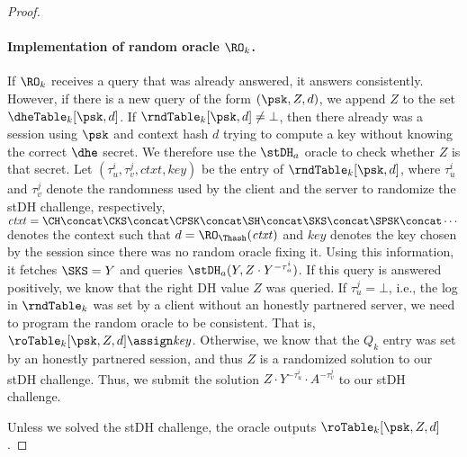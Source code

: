 \begin{proof}
	\paragraph{Implementation of random oracle $\RO_k$.}
	If $\RO_k$ receives a query that was already answered, it answers consistently.
	However, if there is a new query of the form $(\psk, Z, d)$, we append $Z$ to the set $\dheTable_k[\psk, d]$.
	If $\rndTable_k[\psk, d] \neq \bot$, then there already was a session using $\psk$ and context hash $d$ trying to compute a key without knowing the correct $\dhe$ secret.
	We therefore use the $\stDH_a$ oracle to check whether $Z$ is that secret.
	Let $(\tau_u^i, \tau_v^j, \mathit{ctxt}, \mathit{key})$ be the entry of $\rndTable_k[\psk, d]$, where $\tau_u^i$ and $\tau_v^j$ denote the randomness used by the client and the server to randomize the stDH challenge, respectively, $\mathit{ctxt} = \CH \concat \CKS \concat \CPSK \concat \SH \concat \SKS \concat \SPSK \concat \dotsb$ denotes the context such that $d = \RO_\Thash(\mathit{ctxt})$ and $\mathit{key}$ denotes the key chosen by the session since there was no random oracle fixing it.
	Using this information, it fetches $\SKS = Y$ and queries $\stDH_a(Y, Z \cdot Y^{-\tau_u^i})$.
	If this query is answered positively, we know that the right DH value $Z$ was queried.
	If $\tau_u^j = \bot$, i.e., the log in $\rndTable_k$ was set by a client without an honestly partnered server, we need to program the random oracle to be consistent.
	That is, $\roTable_k[\psk, Z, d] \assign \mathit{key}$.
	Otherwise, we know that the $Q_k$ entry was set by an honestly partnered session, and thus $Z$ is a randomized solution to our stDH challenge.
	Thus, we submit the solution $Z \cdot Y^{-\tau_u^i} \cdot A^{-\tau_v^j}$ to our stDH challenge.
	
	Unless we solved the stDH challenge, the oracle outputs $\roTable_k[\psk, Z, d]$.
	

\end{proof}
